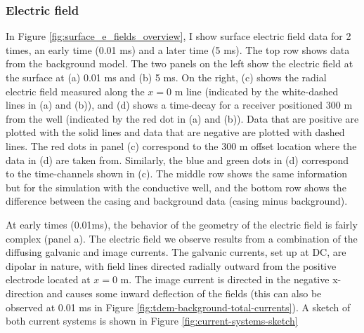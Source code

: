 \subsubsection{Electric field}

In Figure \ref{fig:surface_e_fields_overview}, I show surface electric field data for 2 times, an early time (0.01 ms) and a later time (5 ms). The top row shows data from the background model. The two panels on the left show the electric field at the surface at (a) 0.01 ms and (b) 5 ms. On the right, (c) shows the radial electric field measured along the $x=$0 m line (indicated by the white-dashed lines in (a) and (b)), and (d) shows a time-decay for a receiver positioned 300 m from the well (indicated by the red dot in (a) and (b)). Data that are positive are plotted with the solid lines and data that are negative are plotted with dashed lines. The red dots in panel (c) correspond to the 300 m offset location where the data in (d) are taken from. Similarly, the blue and green dots in (d) correspond to the time-channels shown in (c). The middle row shows the same information but for the simulation with the conductive well, and the bottom row shows the difference between the casing and background data (casing minus background).




At early times (0.01ms), the behavior of the geometry of the electric field is fairly complex (panel a). The electric field we observe results from a combination of the diffusing galvanic and image currents. The galvanic currents, set up at DC, are dipolar in nature, with field lines directed radially outward from the positive electrode located at $x=$0 m. The image current is directed in the negative x-direction and causes some inward deflection of the fields (this can also be observed at 0.01 ms in Figure \ref{fig:tdem-background-total-currents}). A sketch of both current systems is shown in Figure \ref{fig:current-systems-sketch}





